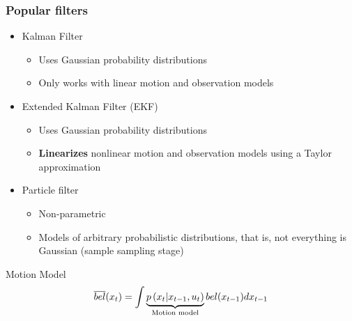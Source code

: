 \begin{frame}
    \frametitle{Popular filters}
    \begin{itemize}
        \item Kalman Filter
        \begin{itemize}
            \item Uses Gaussian probability distributions
            \item Only works with linear motion and observation models
        \end{itemize}
        \item Extended Kalman Filter (EKF)
        \begin{itemize}
            \item Uses Gaussian probability distributions
            \item {\bf Linearizes} nonlinear motion and observation models using a Taylor approximation
        \end{itemize} 
        \item Particle filter
        \begin{itemize}
            \item Non-parametric
            \item Models of arbitrary probabilistic distributions, that is, not everything is Gaussian (sample sampling stage)
        \end{itemize}
     \end{itemize}
    
\end{frame}
    
\begin{frame}{Motion Model}
    \begin{equation*}
    \overline{bel}(x_{t}) = \int \underbrace{p\left(x_{t} | x_{t-1}, u_{t} \right)}_{\text{Motion model}} bel(x_{t-1}) d x_{t-1}
    \end{equation*}
\end{frame}

